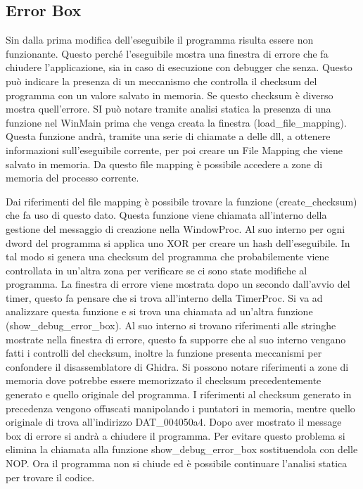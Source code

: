 \documentclass[a4paper,10pt]{article}
\begin{document}
\subsection{Error Box}
Sin dalla prima modifica dell'eseguibile il programma risulta essere non funzionante. Questo perché l'eseguibile mostra una finestra di errore che fa chiudere l'applicazione, sia in caso di esecuzione con debugger che senza.  Questo può indicare la presenza di un meccanismo che controlla il checksum del programma con un valore salvato in memoria. Se questo checksum è diverso mostra quell'errore. SI può notare tramite analisi statica la presenza di una funzione nel WinMain prima che venga creata la finestra (load\_file\_mapping). Questa funzione andrà, tramite una serie di chiamate a delle dll, a ottenere informazioni sull'eseguibile corrente, per poi creare un File Mapping che viene salvato in memoria. Da questo file mapping è possibile accedere a zone di memoria del processo corrente. 

Dai riferimenti del file mapping è possibile trovare la funzione (create\_checksum) che fa uso di questo dato. Questa funzione viene chiamata all'interno della gestione del messaggio di creazione nella WindowProc. Al suo interno per ogni dword del programma si applica uno XOR per creare un hash dell'eseguibile.  In tal modo si genera una checksum del programma che probabilemente viene controllata in un'altra zona per verificare se ci sono state modifiche al programma.  La finestra di errore viene mostrata dopo un secondo dall'avvio del timer, questo fa pensare che si trova all'interno della TimerProc. Si va ad analizzare questa funzione e si trova una chiamata ad un'altra funzione (show\_debug\_error\_box). Al suo interno si trovano riferimenti alle stringhe mostrate nella finestra di errore, questo fa supporre che al suo interno vengano fatti i controlli del checksum, inoltre la funzione presenta meccanismi per confondere il disassemblatore di Ghidra. Si possono notare riferimenti a zone di memoria  dove potrebbe essere memorizzato il checksum precedentemente generato e quello originale del programma. I riferimenti al checksum generato in precedenza vengono offuscati  manipolando i puntatori in memoria, mentre quello originale di trova all'indirizzo DAT\_004050a4. Dopo aver mostrato il message box di errore si andrà a chiudere il programma. Per evitare questo problema si elimina la chiamata alla funzione show\_debug\_error\_box sostituendola con delle NOP. Ora il programma non si chiude ed è possibile continuare l'analisi statica per trovare il codice.
\end{document}
